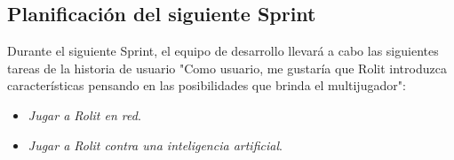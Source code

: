 \documentclass[../../SCRUM.tex]{subfiles}
\begin{document}
\subsection{Planificación del siguiente Sprint}
Durante el siguiente Sprint, el equipo de desarrollo llevará a cabo las siguientes tareas de la historia de usuario "Como usuario, me gustaría que Rolit introduzca características pensando en las posibilidades que brinda el multijugador":
\begin{itemize}
\item \textit{Jugar a Rolit en red}.
\item \textit{Jugar a Rolit contra una inteligencia artificial}.
\end{itemize}
\end{document}
